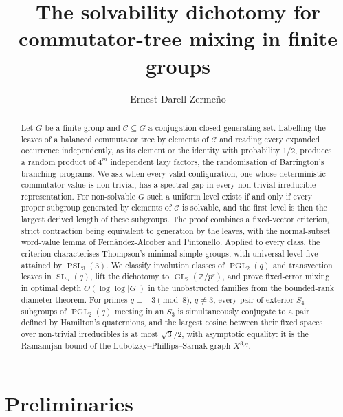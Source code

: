 \documentclass[11pt]{amsart}
\title[The solvability dichotomy for commutator-tree mixing]
{The solvability dichotomy for commutator-tree mixing in finite groups}
\author{Ernest Darell Zermeño}
\theoremstyle{definition}
\theoremstyle{remark}
\theoremstyle{plain}
\theoremstyle{plain}
\numberwithin{equation}{section}
\DeclareMathOperator{\GL}{GL}
\DeclareMathOperator{\SL}{SL}
\DeclareMathOperator{\PGL}{PGL}
\DeclareMathOperator{\PSL}{PSL}
\newcommand{\Z}{\mathbb{Z}}
\begin{document}
\begin{abstract}
Let $G$ be a finite group and $\mathcal C\subseteq G$ a
conjugation-closed generating set. Labelling the leaves of a balanced
commutator tree by elements of $\mathcal C$ and reading every expanded
occurrence independently, as its element or the identity with
probability $1/2$, produces a random product of $4^m$ independent lazy
factors, the randomisation of Barrington's branching programs. We ask
when every valid configuration, one whose deterministic commutator value
is non-trivial, has a spectral gap in every non-trivial irreducible
representation. For non-solvable $G$ such a uniform level exists if and
only if every proper subgroup generated by elements of $\mathcal C$ is
solvable, and the first level is then the largest derived length of
these subgroups. The proof combines a fixed-vector criterion, strict
contraction being equivalent to generation by the leaves, with the
normal-subset word-value lemma of Fern\'andez-Alcober and Pintonello.
Applied to every class, the criterion characterises Thompson's minimal
simple groups, with universal level five attained by $\PSL_3(3)$. We
classify involution classes of $\PGL_2(q)$ and transvection leaves in
$\SL_n(q)$, lift the dichotomy to $\GL_2(\Z/p^r)$, and prove fixed-error
mixing in optimal depth $\Theta(\log\log|G|)$ in the unobstructed
families from the bounded-rank diameter theorem. For primes
$q\equiv\pm3\pmod8$, $q\ne3$, every pair of exterior $S_4$ subgroups of
$\PGL_2(q)$ meeting in an $S_3$ is simultaneously conjugate to a pair
defined by Hamilton's quaternions, and the largest cosine between their
fixed spaces over non-trivial irreducibles is at most $\sqrt3/2$, with
asymptotic equality: it is the Ramanujan bound of the
Lubotzky--Phillips--Sarnak graph $X^{3,q}$.
\end{abstract}

\maketitle



\newpage
\section{Preliminaries}
\label{sec:prelim}
\end{document}
